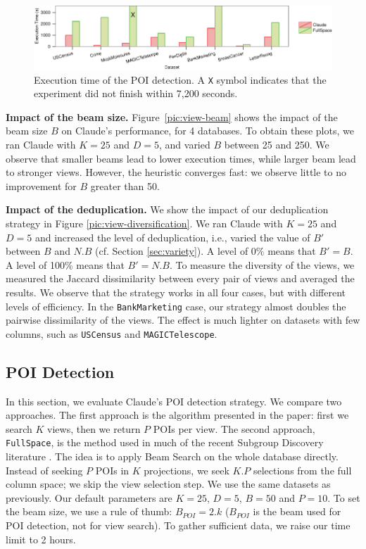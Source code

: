 \begin{figure}[t!]
\centering
\includegraphics[width=1.75\columnwidth]{plots/POI-timing}
\caption{Execution time of the POI detection. A \texttt{X} symbol
indicates that the experiment did not finish within 7,200 seconds.}
\label{pic:POI-time}
\end{figure}\textbf{Impact of the beam size.} Figure~\ref{pic:view-beam} shows the impact
of the beam size $B$ on Claude's performance, for 4 databases. To obtain these
plots, we ran Claude with $K=25$ and $D=5$, and varied $B$ between 25 and 250.
We observe that smaller beams lead to lower execution times, while larger beam
lead to stronger views. However, the heuristic converges fast: we observe
little to no improvement for $B$ greater than 50.

\textbf{Impact of the deduplication.} We show the impact of our deduplication
strategy in Figure \ref{pic:view-diversification}.  We ran Claude with $K=25$
and $D=5$ and increased the level of deduplication, i.e., varied the value of
$B'$ between $B$ and $N.B$ (cf. Section \ref{sec:variety}). A level of 0\%
means that $B'=B$. A level of 100\% means that $B'=N.B$. To measure the
diversity of the views, we measured the Jaccard dissimilarity between every
pair of views and averaged the results. We observe that the strategy works in
all four cases, but with different levels of efficiency. In the
\texttt{BankMarketing} case, our strategy almost doubles the pairwise
dissimilarity of the views. The effect is much lighter on datasets with few
columns, such as \texttt{USCensus} and \texttt{MAGICTelescope}.


\subsection{POI Detection}
\label{sec:exp-poi}

In this section, we evaluate Claude's POI detection strategy. We compare two
approaches. The first approach is the algorithm presented in the paper: first
we search $K$ views, then we return $P$ POIs per view. The second approach,
\texttt{FullSpace}, is the method used in much of the recent Subgroup Discovery
literature \cite{van2011non, duivesteijn2010subgroup}.  The idea is to apply
Beam Search on the whole database directly. Instead of seeking $P$ POIs in $K$
projections, we seek $K.P$ selections from the full column space; we skip the
view selection step. We use the same datasets as previously. Our default
parameters are $K=25$, $D=5$, $B=50$ and $P=10$. To set the beam size, we use a
rule of thumb: $B_{POI} = 2.k$ ($B_{POI}$ is the beam used for POI detection,
not for view search). To gather sufficient data, we raise our time limit to 2
hours. 

